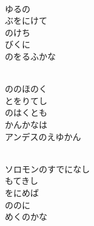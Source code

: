 \documentclass[10pt,b5j]{tarticle} %
\begin{document}
\vspace{1.5em} %
\newcommand{\linespace}{0.5em} %
\newcommand{\blocksize}{0.5\hsize} %
\newcommand{\itemmargin}{3em} %
\begin{enumerate} %
    \setlength{\itemindent}{\itemmargin} %
    \begin{minipage}[c]{\blocksize}
    
        \vspace{\linespace}
        \item~\\
        ゆるの\\
        ぶをにけて\\
        のけち\\
        びくに\\
        のをるふかな
        
    \end{minipage}
    \begin{minipage}[c]{\blocksize}
        
        \vspace{\linespace}
        \item~\\
        ののほのく\\
        とをりてし\\
        のはくとも\\
        かんかなは\\
        アンデスのえゆかん
        
    \end{minipage}
    \begin{minipage}[c]{\blocksize}
        
        \vspace{\linespace}
        \item~\\
        ソロモンのすでになし\\
        もてきし\\
        をにめば\\
        ののに\\
        めくのかな
        

\end{minipage}
\end{enumerate}
\end{document}
